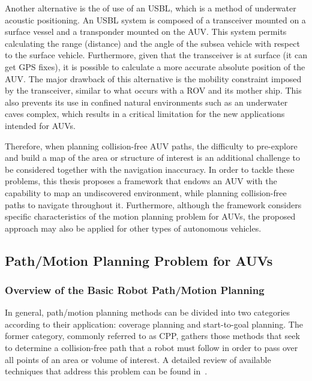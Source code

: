 Another alternative is the of use of an \ac{USBL}, which is a method of
underwater acoustic positioning. An \ac{USBL} system is composed of a
transceiver mounted on a surface vessel and a transponder mounted on the
\ac{AUV}. This system permits calculating the range (distance) and the angle of
the subsea vehicle with respect to the surface vehicle. Furthermore, given that
the transceiver is at surface (\ie it can get GPS fixes), it is possible to
calculate a more accurate absolute position of the \ac{AUV}. The major drawback
of this alternative is the mobility constraint imposed by the transceiver,
similar to what occurs with a \ac{ROV} and its mother ship. This also prevents
its use in confined natural environments such as an underwater caves complex,
which results in a critical limitation for the new applications intended for
\acp{AUV}.

Therefore, when planning collision-free \ac{AUV} paths, the difficulty to
pre-explore and build a map of the area or structure of interest is an
additional challenge to be considered together with the navigation inaccuracy.
In order to tackle these problems, this thesis proposes a framework that endows
an \ac{AUV} with the capability to map an undiscovered environment, while
planning collision-free paths to navigate throughout it. Furthermore, although
the framework considers specific characteristics of the motion planning problem
for \acp{AUV}, the proposed approach may also be applied for other types of
autonomous vehicles.

\subsection{Path/Motion Planning Problem for AUVs}

\subsubsection{Overview of the Basic Robot Path/Motion Planning}

In general, path/motion planning methods can be divided into two categories
according to their application: coverage planning and start-to-goal planning.
The former category, commonly referred to as \ac{CPP}, gathers those methods
that seek to determine a collision-free path that a robot must follow in order to
pass over all points of an area or volume of interest. A detailed review of
available techniques that address this problem can be found
in~\cite{Galceran2013a}.

